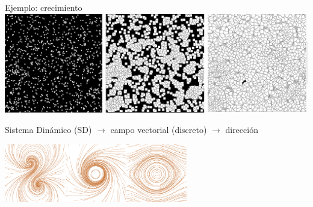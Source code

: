 \documentclass[spanish,unknownkeysallowed,10pt]{beamer}
\begin{document}
\begin{frame}{Ejemplo: crecimiento}
\includegraphics[scale = 0.12]{../figures/modeladocrec}

\vspace{0.1cm}

Sistema Dinámico (SD) $\rightarrow$ campo vectorial (discreto) $\rightarrow$ dirección












  \centerline{\includegraphics[width=8cm]{../figures/Fig2}}


\end{frame}
\end{document}
